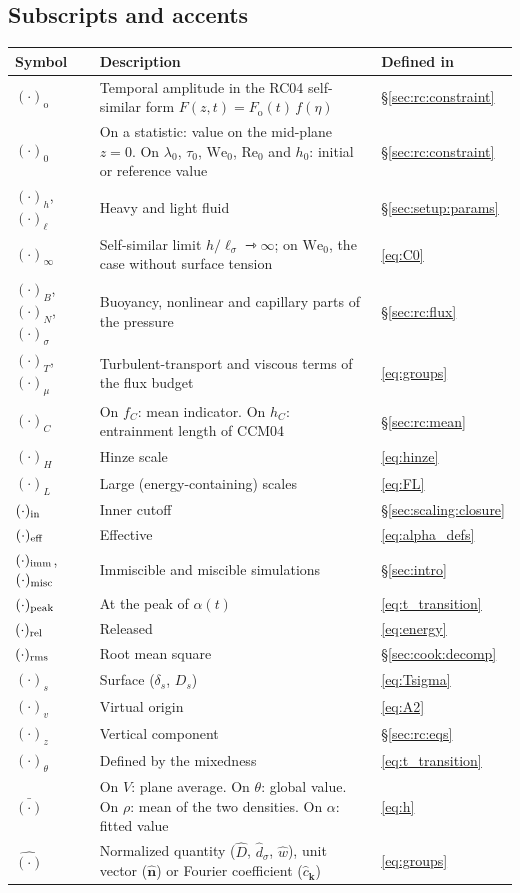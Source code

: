 \documentclass[11pt]{article}
\numberwithin{equation}{section}
\newcommand{\We}{\mathrm{We}_0}
\newcommand{\ls}{\ell_\sigma}
\begin{document}
\subsection*{Subscripts and accents}
\begin{longtable}{@{}P{0.13}P{0.66}P{0.13}@{}}
\toprule
Symbol & Description & Defined in\\
\midrule
\endhead
\bottomrule
\endfoot
$(\cdot)_\mathrm{o}$ & Temporal amplitude in the RC04 self-similar form $F(z, t) = F_\mathrm{o}(t) \, f(\eta)$ & \S\ref{sec:rc:constraint}\\
$(\cdot)_0$ & On a statistic: value on the mid-plane $z = 0$. On $\lambda_0$, $\tau_0$, $\We$, $\mathrm{Re}_0$ and $h_0$: initial or reference value & \S\ref{sec:rc:constraint}\\
$(\cdot)_h$, $(\cdot)_\ell$ & Heavy and light fluid & \S\ref{sec:setup:params}\\
$(\cdot)_\infty$ & Self-similar limit $h/\ls \rightarrowtriangle \infty$; on $\We$, the case without surface tension & \eqref{eq:C0}\\
$(\cdot)_B$, $(\cdot)_N$, $(\cdot)_\sigma$ & Buoyancy, nonlinear and capillary parts of the pressure & \S\ref{sec:rc:flux}\\
$(\cdot)_T$, $(\cdot)_\mu$ & Turbulent-transport and viscous terms of the flux budget & \eqref{eq:groups}\\
$(\cdot)_C$ & On $f_C$: mean indicator. On $h_C$: entrainment length of CCM04 & \S\ref{sec:rc:mean}\\
$(\cdot)_H$ & Hinze scale & \eqref{eq:hinze}\\
$(\cdot)_L$ & Large (energy-containing) scales & \eqref{eq:FL}\\
$(\cdot)_{\rm in}$ & Inner cutoff & \S\ref{sec:scaling:closure}\\
$(\cdot)_{\rm eff}$ & Effective & \eqref{eq:alpha_defs}\\
$(\cdot)_{\rm imm}$, $(\cdot)_{\rm misc}$ & Immiscible and miscible simulations & \S\ref{sec:intro}\\
$(\cdot)_{\rm peak}$ & At the peak of $\alpha(t)$ & \eqref{eq:t_transition}\\
$(\cdot)_{\rm rel}$ & Released & \eqref{eq:energy}\\
$(\cdot)_{\rm rms}$ & Root mean square & \S\ref{sec:cook:decomp}\\
$(\cdot)_s$ & Surface ($\delta_s$, $D_s$) & \eqref{eq:Tsigma}\\
$(\cdot)_v$ & Virtual origin & \eqref{eq:A2}\\
$(\cdot)_z$ & Vertical component & \S\ref{sec:rc:eqs}\\
$(\cdot)_\theta$ & Defined by the mixedness & \eqref{eq:t_transition}\\
$\bar{(\cdot)}$ & On $V$: plane average. On $\theta$: global value. On $\rho$: mean of the two densities. On $\alpha$: fitted value & \eqref{eq:h}\\
$\hat{(\cdot)}$ & Normalized quantity ($\hat D$, $\hat d_\sigma$, $\hat w$), unit vector ($\hat{\mathbf n}$) or Fourier coefficient ($\hat c_{\mathbf k}$) & \eqref{eq:groups}\\
\end{longtable}
\end{document}
